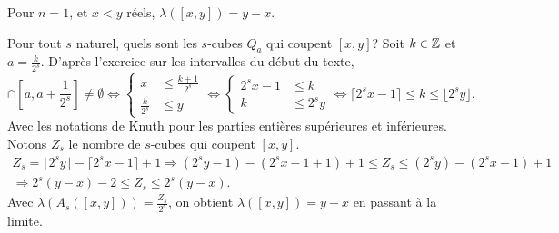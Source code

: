  \begin{propn}
  Pour $n=1$, et $x < y$ réels, $\lambda([x,y]) = y - x$.
 \end{propn}
 \begin{demo}
  Pour tout $s$ naturel, quels sont les $s$-cubes $Q_a$ qui coupent $[x,y]$?\newline
  Soit $k\in \mathbb{Z}$ et $a=\frac{k}{2^s}$. D'après l'exercice sur les intervalles du début du texte,
  \begin{displaymath}
    [x,y] \cap [a, a+\frac{1}{2^s}] \neq \emptyset
    \Leftrightarrow
    \left\lbrace
    \begin{aligned}
       x &\leq \frac{k + 1}{2^s} \\
       \frac{k}{2^s} &\leq y
    \end{aligned}
    \right.
    \Leftrightarrow
    \left\lbrace
    \begin{aligned}
       2^s x -1 &\leq k \\
       k &\leq 2^s y
    \end{aligned}
    \right.
    \Leftrightarrow
    \lceil 2^s x -1 \rceil \leq k \leq \lfloor 2^s y \rfloor .
  \end{displaymath}
Avec les notations de Knuth pour les parties entières supérieures et inférieures. Notons $Z_s$ le nombre de $s$-cubes qui coupent $[x,y]$.
\begin{multline*}
 Z_s = \lfloor 2^s y \rfloor - \lceil 2^s x -1 \rceil + 1 \Rightarrow
 (2^s y-1) - (2^s x -1+1) + 1\leq Z_s \leq (2^s y) - (2^s x -1) + 1 \\
 \Rightarrow
 2^s(y-x) - 2 \leq Z_s \leq 2^s(y-x).
\end{multline*}
Avec $\lambda(A_s([x,y])) = \frac{Z_s}{2^s}$, on obtient $\lambda([x,y])= y-x$ en passant à la limite.
\end{demo}


